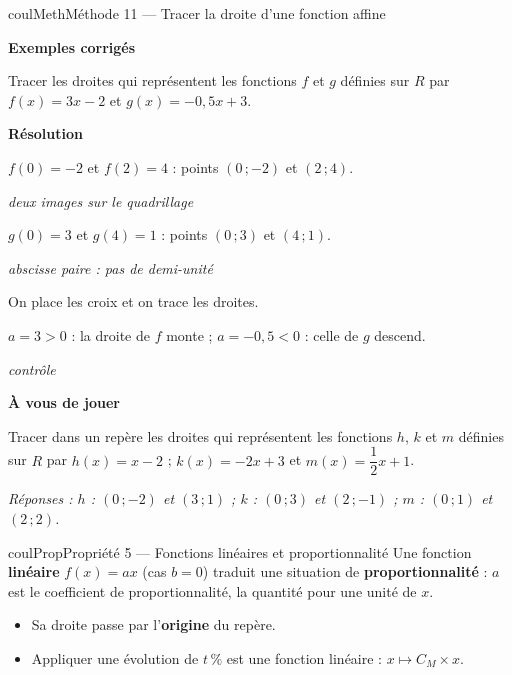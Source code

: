 \documentclass[11pt,a4paper]{article}
\makeatletter
\newcommand{\R}{\mathbb{R}}
\newcommand{\N}{\mathbb{N}}
\newcommand{\Z}{\mathbb{Z}}
\newcommand{\Q}{\mathbb{Q}}
\newcommand{\vect}[1]{\overrightarrow{#1}}
\newcommand{\fois}[1]{\times{\color{coulExo}#1}}
\providecommand{\Cf}{\mathcal{C}\sb{f}}%
\providecommand{\Cg}{\mathcal{C}\sb{g}}%
\newcounter{lycee@signet}
\newcommand{\signet}[3][]{\stepcounter{lycee@signet}%
  \edef\lycee@dest{\if\relax\detokenize{#1}\relax
    signet.\arabic{lycee@signet}\else#1\fi}%
  \hypertarget{\lycee@dest}{}\bookmark[level=#2,dest=\lycee@dest]{#3}}
\def\R{R}\def\N{N}\def\Z{Z}\def\Q{Q}\def\vect#1{#1}\def\Cf{Cf}\def\Cg{Cg}\def\fois#1{×#1}%
\newcounter{methode}
\newenvironment{proprietebox}[1][Propriété]%
  {\begin{boitecours}[phantom={\signet{2}{#1}}]{coulProp}{#1}}{\end{boitecours}}
\newenvironment{methodebox}[1][Méthode]{\stepcounter{methode}%
  \begin{boitecours}[phantom={\signet[methode-\arabic{methode}]{2}{#1}}]{coulMeth}{#1}}%
  {\end{boitecours}}
\newcommand{\etape}[1]{\par\smallskip\textbf{\color{coulMeth}#1}\par\nobreak\smallskip}
\newcommand{\reponse}[1]{\par\smallskip
  {\footnotesize\itshape\color{black!55}Réponses : #1}}
\newcommand{\explique}[2]{\par\smallskip\noindent
  \begin{minipage}[t]{0.57\linewidth}\raggedright #1\end{minipage}\hfill
  \begin{minipage}[t]{0.40\linewidth}\raggedright\leavevmode
    {\small\itshape\color{black!60}#2}\end{minipage}\par}
\newcommand{\cas}[1]{\par\smallskip\noindent\textbf{\color{coulExo}#1}\vadjust{\nobreak}}
\newenvironment{correction}{\par}{\par}
\newcommand{\etapeexemples}{\etape{Exemples corrigés}}
\makeatother
\begin{document}
\begin{methodebox}[Méthode 11 --- Tracer la droite d'une fonction affine]
\etapeexemples
Tracer les droites qui représentent les fonctions $f$ et $g$ définies sur $\R$ par
$f(x)=3x-2$ et $g(x)=-0{,}5x+3$.
\begin{correction}
\cas{Résolution}\par\nopagebreak
\noindent
\begin{minipage}[c]{0.58\linewidth}\raggedright
\explique{$f(0)=-2$ et $f(2)=4$ : points $(0\,;-2)$ et $(2\,;4)$.}{deux images
sur le quadrillage}
\explique{$g(0)=3$ et $g(4)=1$ : points $(0\,;3)$ et $(4\,;1)$.}{abscisse paire : pas
de demi-unité}
\explique{On place les croix et on trace les droites.}{}
\explique{$a=3>0$ : la droite de $f$ monte ; $a=-0{,}5<0$ : celle de $g$
descend.}{contrôle}
\end{minipage}\hfill
\begin{minipage}[c]{0.38\linewidth}\centering
{}
\end{minipage}
\end{correction}

\etape{À vous de jouer}
Tracer dans un repère les droites qui représentent les fonctions $h$, $k$ et $m$ définies
sur $\R$ par $h(x)=x-2$ ; $k(x)=-2x+3$ et $m(x)=\dfrac{1}{2}x+1$.
\reponse{$h$ : $(0\,;-2)$ et $(3\,;1)$ ;\; $k$ : $(0\,;3)$ et $(2\,;-1)$ ;\; $m$ :
$(0\,;1)$ et $(2\,;2)$.}
\end{methodebox}

\begin{proprietebox}[Propriété 5 --- Fonctions linéaires et proportionnalité]
Une fonction \textbf{linéaire} $f(x)=ax$ (cas $b=0$) traduit une situation de
\textbf{proportionnalité} : $a$ est le coefficient de proportionnalité, la quantité
pour une unité de $x$.
\begin{itemize}
  \item Sa droite passe par l'\textbf{origine} du repère.
  \item Appliquer une évolution de $t\,\%$ est une fonction linéaire :
        $x\mapsto C_{M}\times x$.
\end{itemize}
\end{proprietebox}
\end{document}
